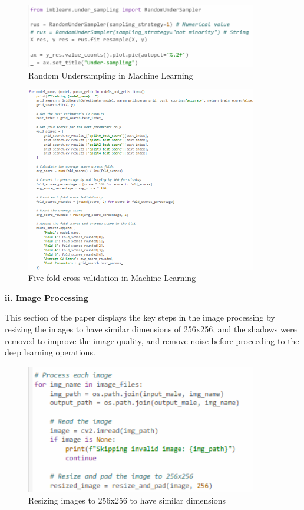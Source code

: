\begin{figure}[!htbp]
	\centering
	\includegraphics[width=0.9\textwidth, angle=0]{figures/random_undersampling_ML.png}
	\caption{Random Undersampling in Machine Learning}
\end{figure}

\begin{figure}[!htbp]
	\centering
	\includegraphics[width=0.9\textwidth, angle=0]{figures/ml_five fold_cv.png}
	\caption{Five fold cross-validation in Machine Learning}
\end{figure}

\newpage
\noindent\textbf{ii. Image Processing}
\vspace{-0.5cm}

This section of the paper displays the key steps in the image processing by resizing the images to have similar dimensions of 256x256, and the shadows were removed to improve the image quality, and remove noise before proceeding to the deep learning operations.
 
\begin{figure}[!htbp]
	\centering
	\includegraphics[width=0.9\textwidth, angle=0]{figures/same_dimensions.png}
	\caption{Resizing images to 256x256 to have similar dimensions}
\end{figure}

